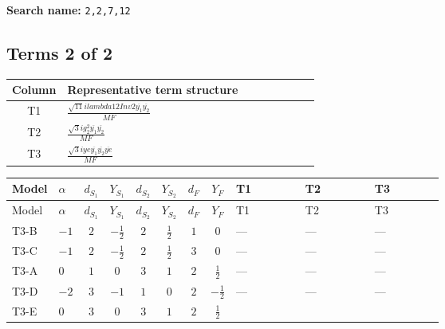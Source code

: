 \documentclass[8pt]{article}
\begin{document}
\begin{landscape}
\begin{longtable}{@{}llcccccc >{\raggedright\arraybackslash}p{0.21\linewidth} >{\raggedright\arraybackslash}p{0.21\linewidth} >{\raggedright\arraybackslash}p{0.21\linewidth}@{}}
\midrule
\bottomrule
\end{longtable}
\clearpage
\noindent\textbf{Search name: }\texttt{2,2,7,12}\par\smallskip
\subsection*{Terms 2 of 2}
\begin{center}
\begin{tabular}{@{}c >{\raggedright\arraybackslash}p{0.82\linewidth}@{}}
\toprule
Column & Representative term structure \\
\midrule
T1 & \(\displaystyle \frac{\sqrt{11} i lambda12Inv2 \overline{y_{1}} \overline{y_{2}}}{MF}\) \\
\midrule
T2 & \(\displaystyle \frac{\sqrt{3} i g_{2}^{2} \overline{y_{1}} \overline{y_{2}}}{MF}\) \\
\midrule
T3 & \(\displaystyle \frac{\sqrt{3} i ye \overline{y_{1}} \overline{y_{2}} \overline{ye}}{MF}\) \\
\midrule
\bottomrule
\end{tabular}
\end{center}
\smallskip
\tiny
\begin{longtable}{@{}llcccccc >{\raggedright\arraybackslash}p{0.21\linewidth} >{\raggedright\arraybackslash}p{0.21\linewidth} >{\raggedright\arraybackslash}p{0.21\linewidth}@{}}
\toprule
Model & $\alpha$ & $d_{S_1}$ & $Y_{S_1}$ & $d_{S_2}$ & $Y_{S_2}$ & $d_F$ & $Y_F$ & T1 & T2 & T3 \\
\midrule
\endfirsthead
\toprule
Model & $\alpha$ & $d_{S_1}$ & $Y_{S_1}$ & $d_{S_2}$ & $Y_{S_2}$ & $d_F$ & $Y_F$ & T1 & T2 & T3 \\
\midrule
\endhead
T3-B & $-1$ & $2$ & $-\frac{1}{2}$ & $2$ & $\frac{1}{2}$ & $1$ & $0$ & --- & --- & --- \\
\midrule
T3-C & $-1$ & $2$ & $-\frac{1}{2}$ & $2$ & $\frac{1}{2}$ & $3$ & $0$ & --- & --- & --- \\
\midrule
T3-A & $0$ & $1$ & $0$ & $3$ & $1$ & $2$ & $\frac{1}{2}$ & --- & --- & --- \\
\midrule
T3-D & $-2$ & $3$ & $-1$ & $1$ & $0$ & $2$ & $-\frac{1}{2}$ & --- & --- & --- \\
\midrule
T3-E & $0$ & $3$ & $0$ & $3$ & $1$ & $2$ & $\frac{1}{2}$ & \scriptsize\adjustbox{max width=\linewidth}{$\begin{gathered} \frac{3 \sqrt{11} i lambda12Inv2 \overline{y_{1}} \overline{y_{2}}}{22 MF}\end{gathered}$} & \scriptsize\adjustbox{max width=\linewidth}{$\begin{gathered} \frac{11 \sqrt{3} i g_{2}^{2} \overline{y_{1}} \overline{y_{2}}}{8 MF}\end{gathered}$} & \scriptsize\adjustbox{max width=\linewidth}{$\begin{gathered} - \frac{\sqrt{3} i ye \overline{y_{1}} \overline{y_{2}} \overline{ye}}{12 MF}\end{gathered}$} \\

\end{longtable}
\end{landscape}
\end{document}
